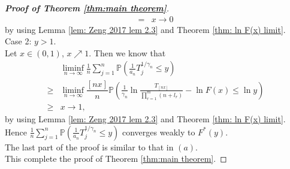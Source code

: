 \documentclass[12pt]{article}
\theoremstyle{plain}
\theoremstyle{definition}
\theoremstyle{remark}
\begin{document}
\begin{proof}[\textit{\textbf{Proof of Theorem \ref{thm:main theorem}}}]
\begin{equation*}
\begin{aligned}
=&x\to 0
 \end{aligned}
\end{equation*}
by using Lemma \ref{lem: Zeng 2017   lem 2.3} and Theorem \ref{thm: ln F(x) limit}.\\
Case 2: $y>1$.\\
Let $x\in (0,1)$, $x\nearrow 1$. Then we know that
\begin{equation*}
	\begin{aligned} 
		& \liminf _{n \rightarrow \infty} \frac{1}{n} \sum_{j=1}^{n} \mathbb{P}\left(\frac{1}{a_{n}} T_{j}^{1 / \gamma_{n}} \leqslant y\right) \\
	\geq& \liminf _{n \rightarrow \infty}\dfrac{[nx]}{n} \mathbb{P}\left(\frac{1}{\gamma_{n}} \ln \frac{T_{[n x]}}{\prod_{r=1}^{m}\left(n+l_{r}\right)}-\ln F(x) \leqslant \ln y\right)	
	\\	\geqslant 
		&x\to 1,
	\end{aligned}
\end{equation*}
by using Lemma \ref{lem: Zeng 2017   lem 2.3} and Theorem \ref{thm: ln F(x) limit}.\\
Hence $\frac{1}{n} \sum_{j=1}^{n} \mathbb{P}\left(\frac{1}{a_{n}} T_{j}^{1 / \gamma_{n}} \leq y\right)$ converges weakly to $F^*(y)$.\\
The last part of the proof is similar to that in $(a)$. \\
This complete the proof of Theorem \ref{thm:main theorem}.
\end{proof}
\end{document}

